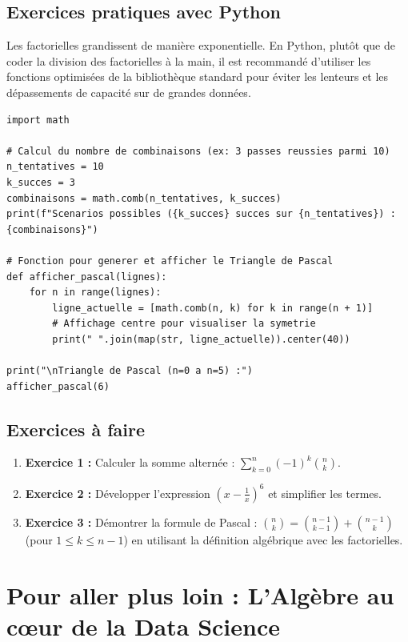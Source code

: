 \documentclass[12pt,a4paper]{report}
\begin{document}
\subsection{Exercices pratiques avec Python}
Les factorielles grandissent de manière exponentielle. En Python, plutôt que de coder la division des factorielles à la main, il est recommandé d'utiliser les fonctions optimisées de la bibliothèque standard pour éviter les lenteurs et les dépassements de capacité sur de grandes données.

\begin{lstlisting}
import math

# Calcul du nombre de combinaisons (ex: 3 passes reussies parmi 10)
n_tentatives = 10
k_succes = 3
combinaisons = math.comb(n_tentatives, k_succes)
print(f"Scenarios possibles ({k_succes} succes sur {n_tentatives}) : {combinaisons}")

# Fonction pour generer et afficher le Triangle de Pascal
def afficher_pascal(lignes):
    for n in range(lignes):
        ligne_actuelle = [math.comb(n, k) for k in range(n + 1)]
        # Affichage centre pour visualiser la symetrie
        print(" ".join(map(str, ligne_actuelle)).center(40))

print("\nTriangle de Pascal (n=0 a n=5) :")
afficher_pascal(6)
\end{lstlisting}

\subsection{Exercices à faire}
\begin{enumerate}
    \item \textbf{Exercice 1 :} Calculer la somme alternée : $\sum_{k=0}^n (-1)^k \binom{n}{k}$.
    \item \textbf{Exercice 2 :} Développer l'expression $\left( x - \frac{1}{x} \right)^6$ et simplifier les termes.
    \item \textbf{Exercice 3 :} Démontrer la formule de Pascal : $\binom{n}{k} = \binom{n-1}{k-1} + \binom{n-1}{k}$ (pour $1 \le k \le n-1$) en utilisant la définition algébrique avec les factorielles.
\end{enumerate}

\section*{Pour aller plus loin : L'Algèbre au cœur de la Data Science}
\end{document}
